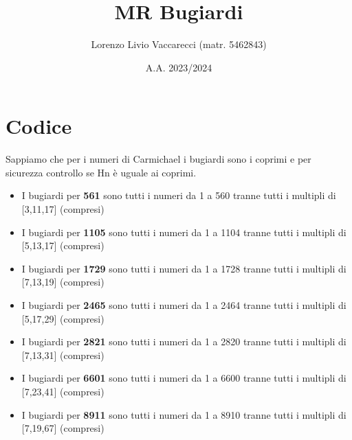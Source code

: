 \documentclass[12pt]{article}
\title{MR Bugiardi}
\author{Lorenzo Livio Vaccarecci (matr. 5462843)}
\date{A.A. 2023/2024}
\begin{document}
\maketitle
\section{Codice}

Sappiamo che per i numeri di Carmichael i bugiardi sono i coprimi e per sicurezza controllo se Hn è uguale ai coprimi.
\begin{itemize}
    \item I bugiardi per \textbf{561} sono tutti i numeri da 1 a 560 tranne tutti i multipli di [3,11,17] (compresi)
    \item I bugiardi per \textbf{1105} sono tutti i numeri da 1 a 1104 tranne tutti i multipli di [5,13,17] (compresi)
    \item I bugiardi per \textbf{1729} sono tutti i numeri da 1 a 1728 tranne tutti i multipli di [7,13,19] (compresi)
    \item I bugiardi per \textbf{2465} sono tutti i numeri da 1 a 2464 tranne tutti i multipli di [5,17,29] (compresi)
    \item I bugiardi per \textbf{2821} sono tutti i numeri da 1 a 2820 tranne tutti i multipli di [7,13,31] (compresi)
    \item I bugiardi per \textbf{6601} sono tutti i numeri da 1 a 6600 tranne tutti i multipli di [7,23,41] (compresi)
    \item I bugiardi per \textbf{8911} sono tutti i numeri da 1 a 8910 tranne tutti i multipli di [7,19,67] (compresi)
\end{itemize}
\end{document}
